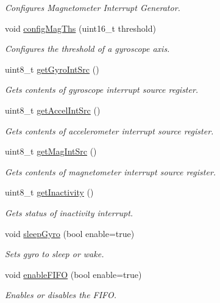 \begin{DoxyCompactItemize}
\begin{DoxyCompactList}\small\item\em Configures Magnetometer Interrupt Generator. \end{DoxyCompactList}\item 
void \hyperlink{classLSM9DS1_a87cf3dd3a4d9ca79106eb7c1c866a224}{config\+Mag\+Ths} (uint16\+\_\+t threshold)
\begin{DoxyCompactList}\small\item\em Configures the threshold of a gyroscope axis. \end{DoxyCompactList}\item 
uint8\+\_\+t \hyperlink{classLSM9DS1_aaba6696754df62a411a6a190100f9ca3}{get\+Gyro\+Int\+Src} ()
\begin{DoxyCompactList}\small\item\em Gets contents of gyroscope interrupt source register. \end{DoxyCompactList}\item 
uint8\+\_\+t \hyperlink{classLSM9DS1_ae42ae3b368370f977d090ba0e53c7f5c}{get\+Accel\+Int\+Src} ()
\begin{DoxyCompactList}\small\item\em Gets contents of accelerometer interrupt source register. \end{DoxyCompactList}\item 
uint8\+\_\+t \hyperlink{classLSM9DS1_a2bc92a37db982059b89e0a06e7d05a95}{get\+Mag\+Int\+Src} ()
\begin{DoxyCompactList}\small\item\em Gets contents of magnetometer interrupt source register. \end{DoxyCompactList}\item 
uint8\+\_\+t \hyperlink{classLSM9DS1_a9dab029d1d24e49709258d893042d28f}{get\+Inactivity} ()
\begin{DoxyCompactList}\small\item\em Gets status of inactivity interrupt. \end{DoxyCompactList}\item 
void \hyperlink{classLSM9DS1_a13b61812069b399547f177b0b0af8fe3}{sleep\+Gyro} (bool enable=true)
\begin{DoxyCompactList}\small\item\em Sets gyro to sleep or wake. \end{DoxyCompactList}\item 
void \hyperlink{classLSM9DS1_a5f01141131318697838f15d7e5d10f2c}{enable\+F\+I\+FO} (bool enable=true)
\begin{DoxyCompactList}\small\item\em Enables or disables the F\+I\+FO. \end{DoxyCompactList}\item 

\end{DoxyCompactItemize}
